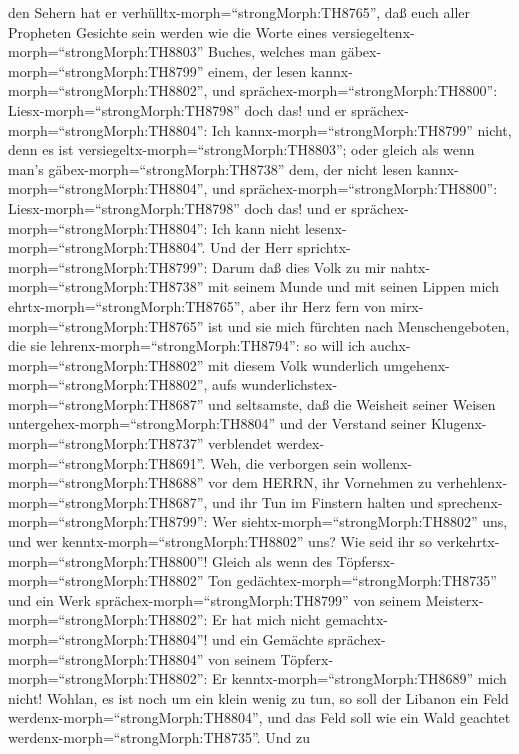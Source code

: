 den Sehern hat er verhülltx-morph=``strongMorph:TH8765'', 
daß euch aller Propheten Gesichte sein werden wie die Worte eines
versiegeltenx-morph=``strongMorph:TH8803'' Buches, welches man
gäbex-morph=``strongMorph:TH8799'' einem, der lesen
kannx-morph=``strongMorph:TH8802'', und
sprächex-morph=``strongMorph:TH8800'':
Liesx-morph=``strongMorph:TH8798'' doch das! und er
sprächex-morph=``strongMorph:TH8804'': Ich
kannx-morph=``strongMorph:TH8799'' nicht, denn es ist
versiegeltx-morph=``strongMorph:TH8803'';  oder gleich als
wenn man's gäbex-morph=``strongMorph:TH8738'' dem, der nicht lesen
kannx-morph=``strongMorph:TH8804'', und
sprächex-morph=``strongMorph:TH8800'':
Liesx-morph=``strongMorph:TH8798'' doch das! und er
sprächex-morph=``strongMorph:TH8804'': Ich kann nicht
lesenx-morph=``strongMorph:TH8804''.  Und der Herr
sprichtx-morph=``strongMorph:TH8799'': Darum daß dies Volk zu mir
nahtx-morph=``strongMorph:TH8738'' mit seinem Munde und mit seinen
Lippen mich ehrtx-morph=``strongMorph:TH8765'', aber ihr Herz fern von
mirx-morph=``strongMorph:TH8765'' ist und sie mich fürchten nach
Menschengeboten, die sie lehrenx-morph=``strongMorph:TH8794'':
 so will ich auchx-morph=``strongMorph:TH8802'' mit diesem
Volk wunderlich umgehenx-morph=``strongMorph:TH8802'', aufs
wunderlichstex-morph=``strongMorph:TH8687'' und seltsamste, daß die
Weisheit seiner Weisen untergehex-morph=``strongMorph:TH8804'' und der
Verstand seiner Klugenx-morph=``strongMorph:TH8737'' verblendet
werdex-morph=``strongMorph:TH8691''.  Weh, die verborgen
sein wollenx-morph=``strongMorph:TH8688'' vor dem HERRN, ihr Vornehmen
zu verhehlenx-morph=``strongMorph:TH8687'', und ihr Tun im Finstern
halten und sprechenx-morph=``strongMorph:TH8799'': Wer
siehtx-morph=``strongMorph:TH8802'' uns, und wer
kenntx-morph=``strongMorph:TH8802'' uns?  Wie seid ihr so
verkehrtx-morph=``strongMorph:TH8800''! Gleich als wenn des
Töpfersx-morph=``strongMorph:TH8802'' Ton
gedächtex-morph=``strongMorph:TH8735'' und ein Werk
sprächex-morph=``strongMorph:TH8799'' von seinem
Meisterx-morph=``strongMorph:TH8802'': Er hat mich nicht
gemachtx-morph=``strongMorph:TH8804''! und ein Gemächte
sprächex-morph=``strongMorph:TH8804'' von seinem
Töpferx-morph=``strongMorph:TH8802'': Er
kenntx-morph=``strongMorph:TH8689'' mich nicht!  Wohlan, es
ist noch um ein klein wenig zu tun, so soll der Libanon ein Feld
werdenx-morph=``strongMorph:TH8804'', und das Feld soll wie ein Wald
geachtet werdenx-morph=``strongMorph:TH8735''.  Und zu
